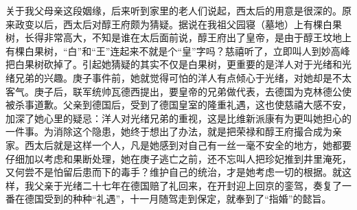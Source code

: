   关于我父母亲这段姻缘，后来听到家里的老人们说起，西太后的用意是很深的。原来政变以后，西太后对醇王府颇为猜疑。据说在我祖父园寝（墓地）上有棵白果树，长得非常高大，不知是谁在太后面前说，醇王府出了皇帝，是由于醇王坟地上有棵白果树，“白”和“王”连起来不就是个“皇”字吗？慈禧听了，立即叫人到妙高峰把白果树砍掉了。引起她猜疑的其实不仅是白果树，更重要的是洋人对于光绪和光绪兄弟的兴趣。庚子事件前，她就觉得可怕的洋人有点倾心于光绪，对她却是不太客气。庚子后，联军统帅瓦德西提出，要皇帝的兄弟做代表，去德国为克林德公使被杀事道歉。父亲到德国后，受到了德国皇室的隆重礼遇，这也使慈禧大感不安，加深了她心里的疑忌：洋人对光绪兄弟的重视，这是比维新派康有为更叫她担心的一件事。为消除这个隐患，她终于想出了办法，就是把荣禄和醇王府撮合成为亲家。西太后就是这样一个人，凡是她感到对自己有一丝一毫不安全的地方，她都要仔细加以考虑和果断处理，她在庚子逃亡之前，还不忘叫人把珍妃推到井里淹死，又何尝不是怕留后患而下的毒手？维护自己的统治，才是她考虑一切的根据。就这样，我父亲于光绪二十七年在德国赔了礼回来，在开封迎上回京的銮驾，奏复了一番在德国受到的种种“礼遇”，十一月随驾走到保定，就奉到了“指婚”的懿旨。\\
